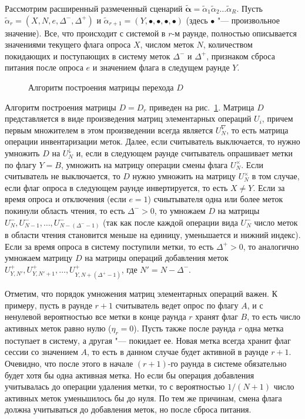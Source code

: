 Рассмотрим расширенный размеченный сценарий $\widetilde{\bm{\alpha}} = \widetilde{\alpha}_1 \widetilde{\alpha}_2 \dots \widetilde{\alpha}_R$. Пусть $\widetilde{\alpha}_r = (X, N, e, \Delta^-, \Delta^+)$ и $\widetilde{\alpha}_{r+1} = (Y, \bullet, \bullet, \bullet, \bullet)$ (здесь $\bullet$ "--- произвольное значение). Все, что происходит с системой в $r$-м раунде, полностью описывается значениями текущего флага опроса $X$, числом меток $N$, количеством покидающих и поступающих в систему меток $\Delta^-$ и $\Delta^+$, признаком сброса питания после опроса $e$ и значением флага в следущем раунде $Y$.

\begin{figure}[htb]
  \caption{Алгоритм построения матрицы перехода $D$}
  \label{fig:ch3_matrix_composition}
\end{figure}

Алгоритм построения матрицы $D = D_r$ приведен на рис.~\ref{fig:ch3_matrix_composition}. Матрица $D$ представляется в виде произведения матриц элементарных операций $U_i$, причем первым множителем в этом произведении всегда является $U_N^\nabla$, то есть матрица операции инвентаризации меток. Далее, если считыватель выключается, то нужно умножить $D$ на $U^\downarrow_N$ и, если в следующем раунде считыватель опрашивает метки по флагу $Y = B$, умножить на матрицу операции смены флага $U^\times_N$. Если считыватель не выключается, то $D$ нужно умножить на матрицу $U^\times_N$ в том случае, если флаг опроса в следующем раунде инвертируется, то есть $X \neq Y$. Если за время опроса и отключения (если $e = 1$) счиытывателя одна или более меток покинули область чтения, то есть $\Delta^- > 0$, то умножаем $D$ на матрицы $U^-_N, U^-_{N-1}, \dots, U^-_{N-(\Delta^--1)}$ (так как после каждой операции вида $U^-_N$ число меток в области чтения становится меньше на единицу, уменьшается и нижний индекс). Если за время опроса в систему поступили метки, то есть $\Delta^+ > 0$, то аналогично умножаем матрицу $D$ на матрицы операций добавления меток $U^+_{Y,N'}, U^+_{Y,N'+1}, \dots, U^+_{Y,N+(\Delta^+-1)}$, где $N' = N - \Delta^-$.

Отметим, что порядок умножения матриц элементарных операций важен. К примеру, пусть в раунде $r+1$ считыватель ведет опрос по флагу $A$, и с ненулевой вероятностью все метки в конце раунда $r$ хранят флаг $B$, то есть число активных меток равно нулю ($\eta_r = 0$). Пусть также после раунда $r$ одна метка поступает в систему, а другая "--- покидает ее. Новая метка всегда хранит флаг сессии со значением $A$, то есть в данном случае будет активной в раунде $r+1$. Очевидно, что после этого в начале $(r+1)$-го раунда в системе обязательно будет хотя бы одна активная метка. Но если бы операция добавления учитывалась до операции удаления метки, то с вероятностью $1/{(N+1)}$ число активных меток уменьшилось бы до нуля. По тем же причинам, смена флага должна учитываться до добавления меток, но после сброса питания.

